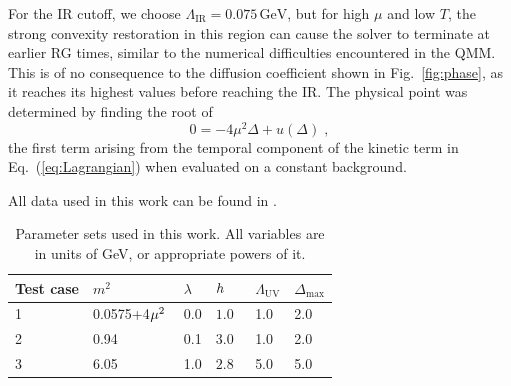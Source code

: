 \documentclass[
onecolumn,
aps,
prd,
amsmath,
amssymb,
nofootinbib
]{revtex4-2}
\begin{document}
For the IR cutoff, we choose $\Lambda_{\text{IR}}=0.075\,\text{GeV}$, but for high $\mu$ and low $T$, the strong convexity restoration in this region can cause the solver to terminate at earlier RG times, similar to the numerical difficulties encountered in the QMM. 
This is of no consequence to the diffusion coefficient shown in Fig.~\ref{fig:phase}, as it reaches its highest values before reaching the IR.
The physical point was determined by finding the root of
\begin{equation}
    0 = -4\mu^2\Delta + u(\Delta)\;,
\end{equation}
the first term arising from the temporal component of the kinetic term in Eq.~(\ref{eq:Lagrangian}) when evaluated on a constant background.

All data used in this work can be found in \cite{poeplau_2026_22031211}.
\begin{table}[htbp]
	\begin{tabular}{|l|l|l|l|l|l|}
    \hline
		Test case&  $m^2$ & $\lambda$\hspace{0.5cm} & $h\hspace{0.4cm}$& $\Lambda_{\mathrm{UV}}$ & $\Delta_{\mathrm{max}}$\\ \hline
		1   & 0.0575+4$\mu^2\hspace{0.1cm}$ & 0.0   &$1.0$ & 1.0   & 2.0 \\ \hline
		2    & 0.94  & 0.1    &$3.0$    & 1.0 & 2.0\\ \hline
		3    & 6.05  & 1.0    &  $2.8$ & 5.0  & 5.0\\ \hline
	\end{tabular}
	\caption{\label{tab:1} Parameter sets used in this work. All variables are in units of GeV, or appropriate powers of it. }
\end{table}
\end{document}
